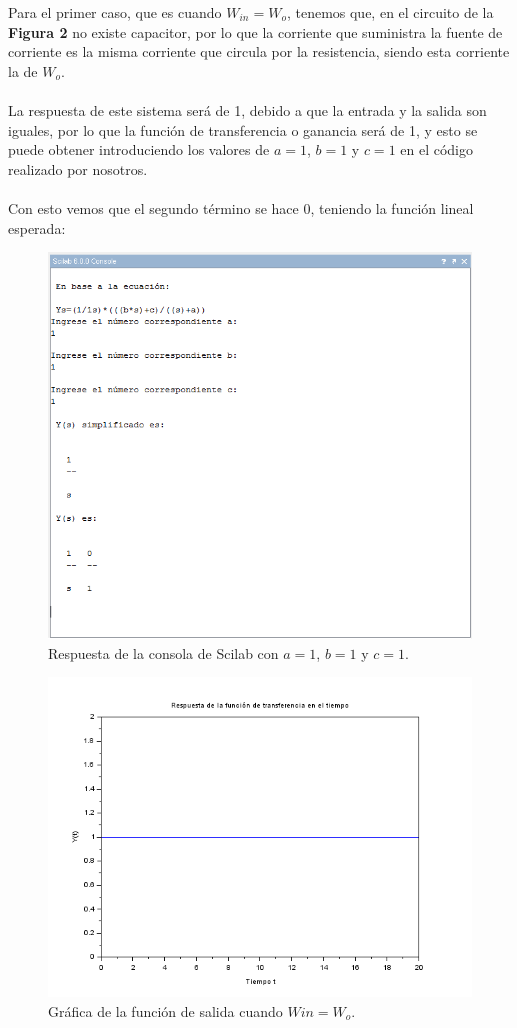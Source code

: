 \documentclass[letterpaper]{article}
\begin{document}
	Para el primer caso, que es cuando $ W_{in}=W_o $, tenemos que, en el circuito de la \textbf{Figura 2} no existe capacitor, por lo que la corriente que suministra la fuente de corriente es la misma corriente que circula por la resistencia, siendo esta corriente la de $ W_o $.\\\\
	La respuesta de este sistema será de 1, debido a que la entrada y la salida son iguales, por lo que la función de transferencia o ganancia será de 1, y esto se puede obtener introduciendo los valores de $ a=1 $, $ b=1 $ y $ c=1 $ en el código realizado por nosotros.\\\\
	Con esto vemos que el segundo término se hace $ 0 $, teniendo la función lineal esperada:
	\begin{figure}[h!]
		\centering
		\includegraphics[scale=.6]{cod}
		\caption{Respuesta de la consola de Scilab con $ a=1 $, $ b=1 $ y $ c=1 $.}
	\end{figure}
	\FloatBarrier
	\begin{figure}[h!]
		\centering
		\includegraphics[scale=.7]{gra1}
		\caption{Gráfica de la función de salida cuando $ W{in}=W_o $.}
	\end{figure}
\end{document}
